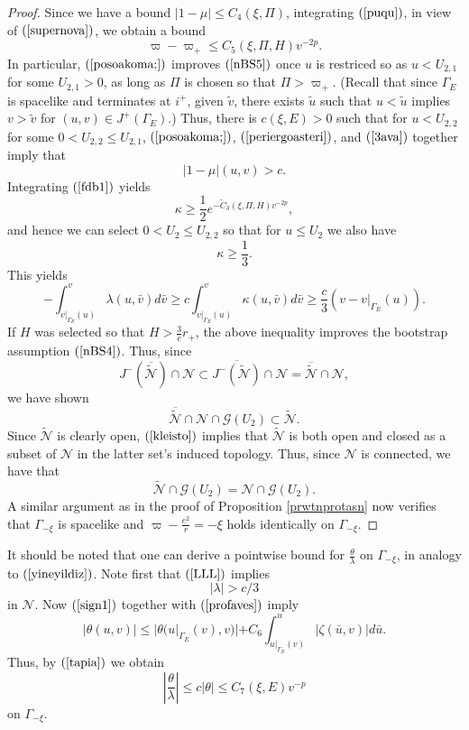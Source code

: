 \documentclass{article}
\newcommand{\tl}{\frac{\theta}{\lambda}}
\begin{document}
{\begin{proof}
Since we have a bound $|1-\mu|\le C_4(\xi,\Pi)$,
integrating $(\ref{puqu})$, in view
of $(\ref{supernova})$, we obtain a bound
\begin{equation}
\label{posoakoma;}
\varpi-\varpi_+\le C_5(\xi,\Pi,H)v^{-2p}.
\end{equation}
In particular, $(\ref{posoakoma;})$
improves $(\ref{nBS5})$ once $u$ is restriced so as $u<U_{2,1}$ for some 
$U_{2,1}>0$, as long
as $\Pi$ is chosen so that $\Pi>\varpi_+$. (Recall that
since $\Gamma_{E}$ is spacelike and terminates at $i^+$,
given $\tilde{v}$, there exists $\tilde{u}$ such that
$u<\tilde{u}$ implies $v>\tilde{v}$ for $(u,v)\in J^+(\Gamma_{E})$.)
Thus, there is $c(\xi,E)>0$ such that
for $u<U_{2,2}$ for some $0<U_{2,2}\le U_{2,1}$, $(\ref{posoakoma;})$,
$(\ref{periergoasteri})$, and
$(\ref{3ava})$ together imply that
\begin{equation}
\label{LLL}
|1-\mu|(u,v)>c.
\end{equation}
Integrating $(\ref{fdb1})$ yields
\[
\kappa\ge\frac12e^{-\tilde{C}_3(\xi,\Pi,H)v^{-2p}},
\]
and hence
we can select $0<U_2\le U_{2,2}$ so that for $u\le U_2$ we also have
\[
\kappa\ge\frac13.
\]
This yields
\[
-\int_{v|_{\Gamma_{E}}(u)}^v\lambda(u,\bar{v})d\bar{v}\ge 
c\int_{v|_{\Gamma_{E}}(u)}^v\kappa(u,\bar{v})d\bar{v}
\ge\frac{c}3(v-v|_{\Gamma_{E}}(u)).
\]
If $H$ was selected so that $H>\frac3cr_+$, the above inequality
improves the bootstrap assumption $(\ref{nBS4})$.
Thus, since
\[
J^-\left(\overline{\tilde{\mathcal{N}}}\right)\cap \mathcal{N}
\subset
\overline{J^-(\tilde{\mathcal{N}})}\cap \mathcal{N}
=
\overline{\tilde{\mathcal{N}}}\cap \mathcal{N},
\]
we have shown
\begin{equation}
\label{kleisto}
\overline{\tilde{\mathcal{N}}}
\cap \mathcal{N}\cap\mathcal{G}(U_2)\subset{\tilde{\mathcal{N}}}.
\end{equation}
Since $\tilde{\mathcal{N}}$ is clearly open, $(\ref{kleisto})$ implies
that $\tilde{\mathcal{N}}$ is both open and closed as a subset of $\mathcal{N}$ in
the latter set's induced topology. Thus, since $\mathcal{N}$ is connected,
we have that
\[
\tilde{\mathcal{N}}\cap\mathcal{G}(U_2)=\mathcal{N}\cap\mathcal{G}(U_2).
\]
A similar argument as in the proof of Proposition \ref{prwtnprotasn} now
verifies that $\Gamma_{-\xi}$ is spacelike
and $\varpi-\frac{e^2}r=-\xi$ holds identically
on $\Gamma_{-\xi}$.
\end{proof}

It should be noted that one can derive a pointwise bound
for $\tl$ on $\Gamma_{-\xi}$, in analogy to $(\ref{yineyildiz})$.
Note first that $(\ref{LLL})$ implies 
\begin{equation}
\label{profaves}
|\lambda|>c/3
\end{equation}
in $\mathcal{N}$. Now
$(\ref{sign1})$ together with $(\ref{profaves})$ imply
\[
|\theta(u,v)|\le|\theta(u|_{\Gamma_{E}}(v),v)|
+C_6\int_{u|_{\Gamma_{E}}(v)}^{u}{|\zeta(\bar{u},v)|
d\bar{u}}.
\]
Thus, by $(\ref{tapia})$
we obtain
\begin{equation}
\label{toavalogo}
\left|\tl\right|\le c|\theta|\le C_7(\xi,E)v^{-p}
\end{equation}
on $\Gamma_{-\xi}$.

}
\end{document}
